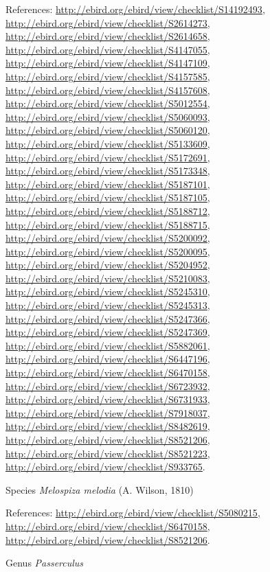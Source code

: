 \documentclass[9pt, article]{memoir}
\begin{document}
\begin{multicols}{2}
\vspace{6pt}References: 
\url{http://ebird.org/ebird/view/checklist/S14192493}, 
\url{http://ebird.org/ebird/view/checklist/S2614273}, 
\url{http://ebird.org/ebird/view/checklist/S2614658}, 
\url{http://ebird.org/ebird/view/checklist/S4147055}, 
\url{http://ebird.org/ebird/view/checklist/S4147109}, 
\url{http://ebird.org/ebird/view/checklist/S4157585}, 
\url{http://ebird.org/ebird/view/checklist/S4157608}, 
\url{http://ebird.org/ebird/view/checklist/S5012554}, 
\url{http://ebird.org/ebird/view/checklist/S5060093}, 
\url{http://ebird.org/ebird/view/checklist/S5060120}, 
\url{http://ebird.org/ebird/view/checklist/S5133609}, 
\url{http://ebird.org/ebird/view/checklist/S5172691}, 
\url{http://ebird.org/ebird/view/checklist/S5173348}, 
\url{http://ebird.org/ebird/view/checklist/S5187101}, 
\url{http://ebird.org/ebird/view/checklist/S5187105}, 
\url{http://ebird.org/ebird/view/checklist/S5188712}, 
\url{http://ebird.org/ebird/view/checklist/S5188715}, 
\url{http://ebird.org/ebird/view/checklist/S5200092}, 
\url{http://ebird.org/ebird/view/checklist/S5200095}, 
\url{http://ebird.org/ebird/view/checklist/S5204952}, 
\url{http://ebird.org/ebird/view/checklist/S5210083}, 
\url{http://ebird.org/ebird/view/checklist/S5245310}, 
\url{http://ebird.org/ebird/view/checklist/S5245313}, 
\url{http://ebird.org/ebird/view/checklist/S5247366}, 
\url{http://ebird.org/ebird/view/checklist/S5247369}, 
\url{http://ebird.org/ebird/view/checklist/S5882061}, 
\url{http://ebird.org/ebird/view/checklist/S6447196}, 
\url{http://ebird.org/ebird/view/checklist/S6470158}, 
\url{http://ebird.org/ebird/view/checklist/S6723932}, 
\url{http://ebird.org/ebird/view/checklist/S6731933}, 
\url{http://ebird.org/ebird/view/checklist/S7918037}, 
\url{http://ebird.org/ebird/view/checklist/S8482619}, 
\url{http://ebird.org/ebird/view/checklist/S8521206}, 
\url{http://ebird.org/ebird/view/checklist/S8521223}, 
\url{http://ebird.org/ebird/view/checklist/S933765}.

\vspace{6pt}\noindent\hspace{36pt}Species \textit{Melospiza melodia} (A. Wilson, 1810)


\vspace{6pt}References: 
\url{http://ebird.org/ebird/view/checklist/S5080215}, 
\url{http://ebird.org/ebird/view/checklist/S6470158}, 
\url{http://ebird.org/ebird/view/checklist/S8521206}.

\vspace{6pt}\noindent\hspace{30pt}Genus \textit{Passerculus}



\end{multicols}
\end{document}
